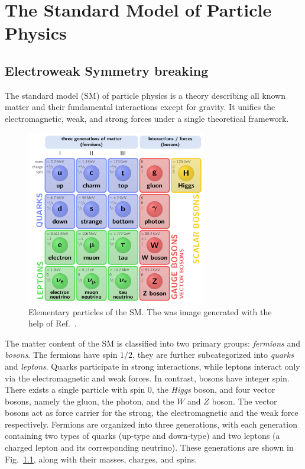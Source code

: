 
\chapter{The Standard Model of Particle Physics}\label{chap:two}

\section{Electroweak Symmetry breaking} \label{sec:2:EW_symmetry_breaking}
The standard model (\acs{SM}) of particle physics is a theory describing all known matter and their fundamental interactions except for gravity. It unifies the electromagnetic, weak, and strong forces under a single theoretical framework.
\begin{figure}
\centering
\includegraphics[width=0.7\textwidth]{Images/SM.pdf}
\caption{Elementary particles of the \acs{SM}. The was image generated with the help of Ref.~\cite{Neutelings_2024}.}
\label{fig:2:SM}
\end{figure}
The matter content of the \acs{SM} is classified into two primary groups: \textit{fermions} and \textit{bosons}. The fermions have spin $1/2$, they are further subcategorized into \textit{quarks} and \textit{leptons}. Quarks participate in strong interactions, while leptons interact only via the electromagnetic and weak forces. In contrast, bosons have integer spin. There exists a single particle with spin 0, the \textit{Higgs} boson, and four vector bosons, namely the gluon, the photon, and the $W$ and $Z$ boson. The vector bosons act as force carrier for the strong, the electromagnetic and the weak force respectively. Fermions are organized into three generations, with each generation containing two types of quarks (up-type and down-type) and two leptons (a charged lepton and its corresponding neutrino). These generations are shown in Fig.~\ref{fig:2:SM}, along with their masses, charges, and spins.


